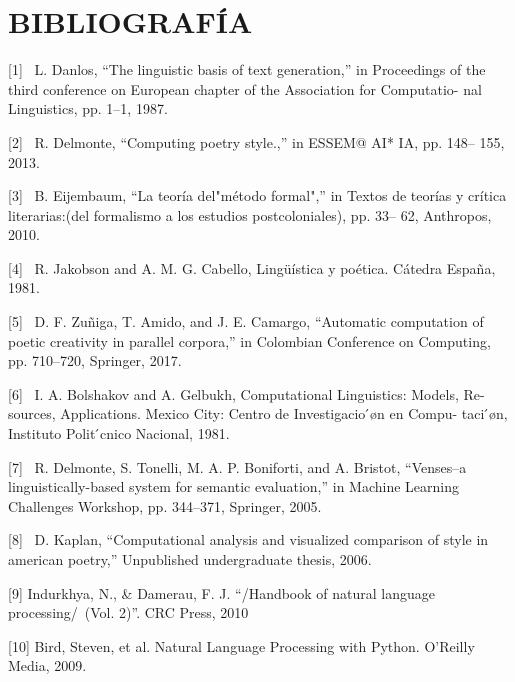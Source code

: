 \documentclass[twoside]{article}
\begin{document}
\section{BIBLIOGRAFÍA}
\label{sec:org6f5eebf}

[1]  L. Danlos, “The linguistic basis of text generation,” in
Proceedings of the third conference on European chapter of the
Association for Computatio- nal Linguistics, pp. 1--1, 1987.

[2]  R. Delmonte, “Computing poetry style.,” in ESSEM@ AI* IA, pp. 148--
155, 2013.

[3]  B. Eijembaum, “La teoría del"método formal",” in Textos de teorías
y crítica literarias:(del formalismo a los estudios postcoloniales), pp.
33-- 62, Anthropos, 2010.

[4]  R. Jakobson and A. M. G. Cabello, Lingüística y poética. Cátedra
España, 1981.

[5]  D. F. Zuñiga, T. Amido, and J. E. Camargo, “Automatic computation
of poetic creativity in parallel corpora,” in Colombian Conference on
Computing, pp. 710--720, Springer, 2017.

[6]  I. A. Bolshakov and A. Gelbukh, Computational Linguistics: Models,
Re- sources, Applications. Mexico City: Centro de Investigacio ́øn en
Compu- taci ́øn, Instituto Polit ́cnico Nacional, 1981.

[7]  R. Delmonte, S. Tonelli, M. A. P. Boniforti, and A. Bristot,
“Venses--a linguistically-based system for semantic evaluation,” in
Machine Learning Challenges Workshop, pp. 344--371, Springer, 2005.

[8]  D. Kaplan, “Computational analysis and visualized comparison of
style in american poetry,” Unpublished undergraduate thesis, 2006.

[9] Indurkhya, N., \& Damerau, F. J. “/Handbook of natural language
processing/ (Vol. 2)”. CRC Press, 2010


[10] Bird, Steven, et al. Natural Language Processing with Python.
O'Reilly Media, 2009.




\end{document}

